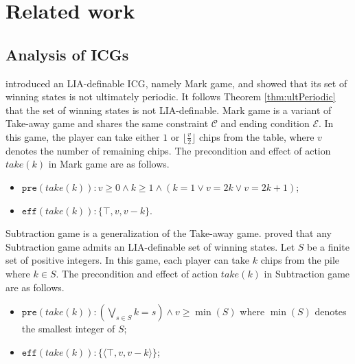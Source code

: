 \documentclass[review]{elsarticle}
\newcommand{\set}[1]{\{ #1 \}}
\newcommand{\tuple}[1]{\langle {#1} \rangle}
\newcommand{\true}{\top}
\newcommand{\constraint}{\mathcal{C}}
\newcommand{\estate}{\mathcal{E}}
\newcommand{\pre}{\mathtt{pre}}
\newcommand{\eff}{\mathtt{eff}}
\newtheorem{theorem}{Theorem}
\begin{document}
\section{Related work}
\subsection{Analysis of ICGs}
\citet{Fra2011} introduced an LIA-definable ICG, namely Mark game, and showed that its set of winning states is not ultimately periodic.
It follows Theorem \ref{thm:ultPeriodic} that the set of winning states is not LIA-definable.
Mark game is a variant of Take-away game and shares the same constraint $\constraint$ and ending condition $\estate$.
In this game, the player can take either $1$ or $\lfloor \frac{v}{2} \rfloor$ chips from the table, where $v$ denotes the number of remaining chips.
The precondition and effect of action $take(k)$ in Mark game are as follows.
\begin{itemize}
	\item $\pre(take(k)) :  v \ge 0 \land k \ge 1 \land (k = 1 \lor v = 2k \lor v = 2k + 1)$;
	\item $\eff(take(k)) : \set{\true, v, v - k}$.
\end{itemize}





Subtraction game \cite{Yag2001} is a generalization of the Take-away game.
\citet{BerCG2001} proved that any Subtraction game admits an LIA-definable set of winning states.
Let $S$ be a finite set of positive integers.
In this game, each player can take $k$ chips from the pile where $ k \in S$.
The precondition and effect of action $take(k)$ in Subtraction game are as follows.
\begin{itemize}
	\item $\pre(take(k)) : (\bigvee_{s \in S} k = s) \land v \geq \min(S)$ where $\min(S)$ denotes the smallest integer of $S$;
	\item $\eff(take(k)) : \set{\tuple{\true, v, v - k}}$;
\end{itemize}
\end{document}

